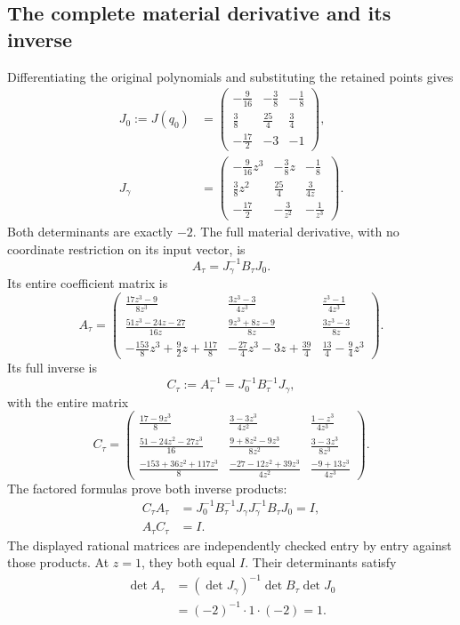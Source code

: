 \subsection{The complete material derivative and its inverse}

Differentiating the original polynomials and substituting the retained
points gives
\[
\begin{aligned}
J_0:=J(q_0)&=
\begin{pmatrix}
-\frac9{16}&-\frac38&-\frac18\\
\frac38&\frac{25}4&\frac34\\
-\frac{17}2&-3&-1
\end{pmatrix},\\[5pt]
J_\gamma&=
\begin{pmatrix}
-\frac9{16}z^3&-\frac38z&-\frac18\\
\frac38z^2&\frac{25}4&\frac3{4z}\\
-\frac{17}2&-\frac3{z^2}&-\frac1{z^3}
\end{pmatrix}.
\end{aligned}
\]
Both determinants are exactly \(-2\). The full material derivative, with no
coordinate restriction on its input vector, is
\[
A_\tau=J_\gamma^{-1}B_\tau J_0.
\]
Its entire coefficient matrix is
\[
A_\tau=
\begin{pmatrix}
\frac{17z^3-9}{8z^3}&
\frac{3z^3-3}{4z^3}&
\frac{z^3-1}{4z^3}\\[3pt]
\frac{51z^3-24z-27}{16z}&
\frac{9z^3+8z-9}{8z}&
\frac{3z^3-3}{8z}\\[3pt]
-\frac{153}8z^3+\frac92z+\frac{117}8&
-\frac{27}4z^3-3z+\frac{39}4&
\frac{13}4-\frac94z^3
\end{pmatrix}.
\]
Its full inverse is
\[
C_\tau:=A_\tau^{-1}=J_0^{-1}B_\tau^{-1}J_\gamma,
\]
with the entire matrix
\[
C_\tau=
\begin{pmatrix}
\frac{17-9z^3}8&
\frac{3-3z^3}{4z^2}&
\frac{1-z^3}{4z^3}\\[3pt]
\frac{51-24z^2-27z^3}{16}&
\frac{9+8z^2-9z^3}{8z^2}&
\frac{3-3z^3}{8z^3}\\[3pt]
\frac{-153+36z^2+117z^3}8&
\frac{-27-12z^2+39z^3}{4z^2}&
\frac{-9+13z^3}{4z^3}
\end{pmatrix}.
\]
The factored formulas prove both inverse products:
\[
\begin{aligned}
C_\tau A_\tau
&=J_0^{-1}B_\tau^{-1}J_\gamma
 J_\gamma^{-1}B_\tau J_0=I,\\
A_\tau C_\tau&=I.
\end{aligned}
\]
The displayed rational matrices are independently checked entry by entry
against those products. At \(z=1\), they both equal \(I\). Their determinants
satisfy
\[
\begin{aligned}
\det A_\tau
&=(\det J_\gamma)^{-1}\det B_\tau\det J_0\\
&=(-2)^{-1}\cdot1\cdot(-2)=1.
\end{aligned}
\]

